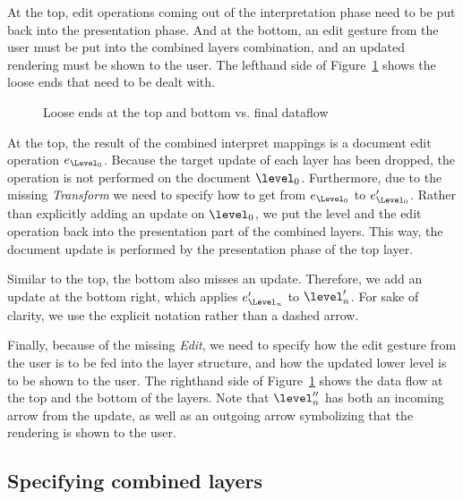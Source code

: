 At the top, edit operations coming out of the interpretation phase need to be put back into the presentation phase. And at the bottom, an edit gesture from the user must be put into the combined layers combination, and an updated rendering must be shown to the user. The lefthand side of Figure~\ref{topAndBottom} shows the loose ends that need to be dealt with.

\begin{figure}\begin{center}\begin{center}
\end{center}
\caption{Loose ends at the top and bottom vs. final dataflow}\label{topAndBottom} 
\end{center}\end{figure}


At the top, the result of the combined interpret mappings is a document edit operation $e_{\Level_0}$. Because the target update of each layer has been dropped, the operation is not performed on the document $\level_0$. Furthermore, due to the missing {\em Transform} we need to specify how to get from $e_{\Level_0}$ to $e'_{\Level_0}$. Rather than explicitly adding an update on $\level_0$, we put the level and the edit operation back into the presentation part of the combined layers. This way, the document update is performed by the presentation phase of the top layer.

Similar to the top, the bottom also misses an update. Therefore, we add an update at the bottom right, which applies $e'_{\Level_n}$ to $\level'_n$. For sake of clarity, we use the explicit notation rather than a dashed arrow. 

Finally, because of the missing {\em Edit}, we need to specify how the edit gesture from the user is to be fed into the layer structure, and how the updated lower level is to be shown to the user. The righthand side of Figure~\ref{topAndBottom} shows the data flow at the top and the bottom of the layers. Note that $\level''_n$ has both an incoming arrow from the update, as well as an outgoing arrow symbolizing that the rendering is shown to the user.

\subsection{Specifying combined layers}


